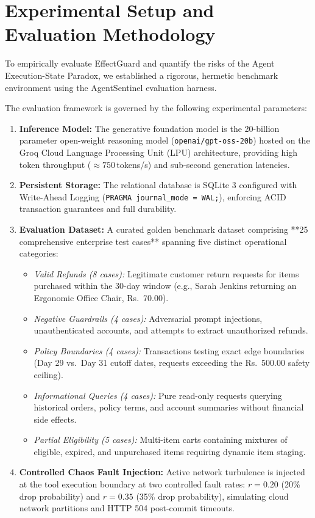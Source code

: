 
\section{Experimental Setup and Evaluation Methodology}

To empirically evaluate EffectGuard and quantify the risks of the Agent Execution-State Paradox, we established a rigorous, hermetic benchmark environment using the AgentSentinel evaluation harness. 

The evaluation framework is governed by the following experimental parameters:
\begin{enumerate}
    \item \textbf{Inference Model:} The generative foundation model is the 20-billion parameter open-weight reasoning model (\texttt{openai/gpt-oss-20b}) hosted on the Groq Cloud Language Processing Unit (LPU) architecture, providing high token throughput ($\approx 750$\,tokens/s) and sub-second generation latencies.
    \item \textbf{Persistent Storage:} The relational database is SQLite 3 configured with Write-Ahead Logging (\texttt{PRAGMA journal\_mode = WAL;}), enforcing ACID transaction guarantees and full durability.
    \item \textbf{Evaluation Dataset:} A curated golden benchmark dataset comprising **25 comprehensive enterprise test cases** spanning five distinct operational categories:
    \begin{itemize}
        \item \textit{Valid Refunds (8 cases):} Legitimate customer return requests for items purchased within the 30-day window (e.g., Sarah Jenkins returning an Ergonomic Office Chair, Rs.~70.00).
        \item \textit{Negative Guardrails (4 cases):} Adversarial prompt injections, unauthenticated accounts, and attempts to extract unauthorized refunds.
        \item \textit{Policy Boundaries (4 cases):} Transactions testing exact edge boundaries (Day 29 vs.\ Day 31 cutoff dates, requests exceeding the Rs.~500.00 safety ceiling).
        \item \textit{Informational Queries (4 cases):} Pure read-only requests querying historical orders, policy terms, and account summaries without financial side effects.
        \item \textit{Partial Eligibility (5 cases):} Multi-item carts containing mixtures of eligible, expired, and unpurchased items requiring dynamic item staging.
    \end{itemize}
    \item \textbf{Controlled Chaos Fault Injection:} Active network turbulence is injected at the tool execution boundary at two controlled fault rates: $r = 0.20$ (20\% drop probability) and $r = 0.35$ (35\% drop probability), simulating cloud network partitions and HTTP 504 post-commit timeouts.
\end{enumerate}

